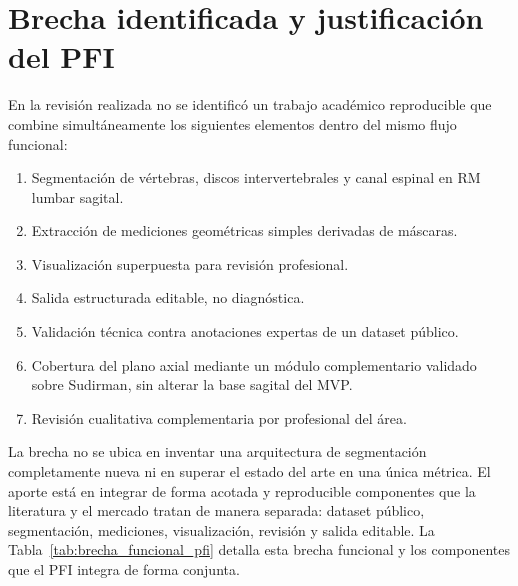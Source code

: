 \section{Brecha identificada y justificación del PFI}

En la revisión realizada no se identificó un trabajo académico reproducible que combine simultáneamente los siguientes elementos dentro del mismo flujo funcional:

\begin{enumerate}
    \item Segmentación de vértebras, discos intervertebrales y canal espinal en RM lumbar sagital.
    \item Extracción de mediciones geométricas simples derivadas de máscaras.
    \item Visualización superpuesta para revisión profesional.
    \item Salida estructurada editable, no diagnóstica.
    \item Validación técnica contra anotaciones expertas de un dataset público.
    \item Cobertura del plano axial mediante un módulo complementario validado sobre Sudirman, sin alterar la base sagital del MVP.
    \item Revisión cualitativa complementaria por profesional del área.
\end{enumerate}

La brecha no se ubica en inventar una arquitectura de segmentación completamente nueva ni en superar el estado del arte en una única métrica. El aporte está en integrar de forma acotada y reproducible componentes que la literatura y el mercado tratan de manera separada: dataset público, segmentación, mediciones, visualización, revisión y salida editable. La Tabla~\ref{tab:brecha_funcional_pfi} detalla esta brecha funcional y los componentes que el PFI integra de forma conjunta.

